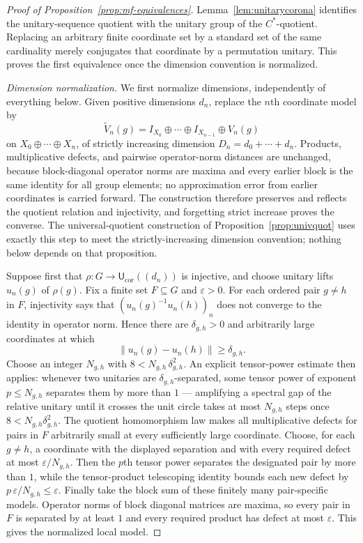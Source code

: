 \documentclass[11pt]{amsart}
\theoremstyle{definition}
\theoremstyle{remark}
\theoremstyle{plain}
\newcommand{\Ucor}{\mathsf U_{\mathrm{cor}}}
\begin{document}
\begin{proof}[Proof of Proposition~\ref{prop:mf-equivalences}]
Lemma~\ref{lem:unitarycorona} identifies the unitary-sequence quotient with
the unitary group of the $C^*$-quotient.  Replacing an arbitrary
finite coordinate set by a standard set of the same cardinality merely
conjugates that coordinate by a permutation unitary.  This proves the first
equivalence once the dimension convention is normalized.

\emph{Dimension normalization.}  We first normalize dimensions,
independently of everything below.  Given positive dimensions $d_n$,
replace the $n$th coordinate model by
\[
 \widetilde V_n(g)=I_{X_0}\oplus\cdots\oplus I_{X_{n-1}}\oplus V_n(g)
\]
on $X_0\oplus\cdots\oplus X_n$, of strictly increasing dimension
$D_n=d_0+\cdots+d_n$.  Products, multiplicative defects, and pairwise
operator-norm distances are unchanged, because block-diagonal operator
norms are maxima and every earlier block is the same identity for all
group elements; no approximation error from earlier coordinates is
carried forward.  The construction therefore preserves and reflects
the quotient relation and injectivity, and forgetting strict increase
proves the converse.  The universal-quotient construction of
Proposition~\ref{prop:univquot} uses exactly this step to meet the
strictly-increasing dimension convention; nothing below depends on
that proposition.

Suppose first that
$\rho\colon G\to\Ucor((d_n))$ is injective, and choose unitary lifts
$u_n(g)$ of $\rho(g)$.  Fix a finite set $F\subseteq G$ and $\varepsilon>0$.
For each ordered pair $g\ne h$ in $F$, injectivity says that
$(u_n(g)^{-1}u_n(h))_n$ does not converge to the identity in operator norm.
Hence there are $\delta_{g,h}>0$ and arbitrarily large coordinates at which
\[
 \lVert u_n(g)-u_n(h)\rVert\ge\delta_{g,h}.
\]
Choose an integer $N_{g,h}$ with $8<N_{g,h}\,\delta_{g,h}^2$.  An explicit
tensor-power estimate then applies: whenever two unitaries are
$\delta_{g,h}$-separated, some tensor power of exponent $p\le N_{g,h}$
separates them by more than $1$ --- amplifying a spectral gap of the
relative unitary until it crosses the unit circle takes at most
$N_{g,h}$ steps once $8<N_{g,h}\delta_{g,h}^2$.
The quotient homomorphism law makes all multiplicative defects for pairs in
$F$ arbitrarily small at every sufficiently large coordinate.  Choose, for
each $g\ne h$, a coordinate with the displayed separation and with every
required defect at most $\varepsilon/N_{g,h}$.  Then the $p$th tensor
power separates the designated pair by more than $1$, while the
tensor-product telescoping identity bounds each new defect by
$p\,\varepsilon/N_{g,h}\le\varepsilon$.  Finally take the block
sum of these finitely many pair-specific models.  Operator norms of block
diagonal matrices are maxima, so every pair in $F$ is separated by at least
$1$ and every required product has defect at most $\varepsilon$.  This gives
the normalized local model.


\end{proof}
\end{document}
